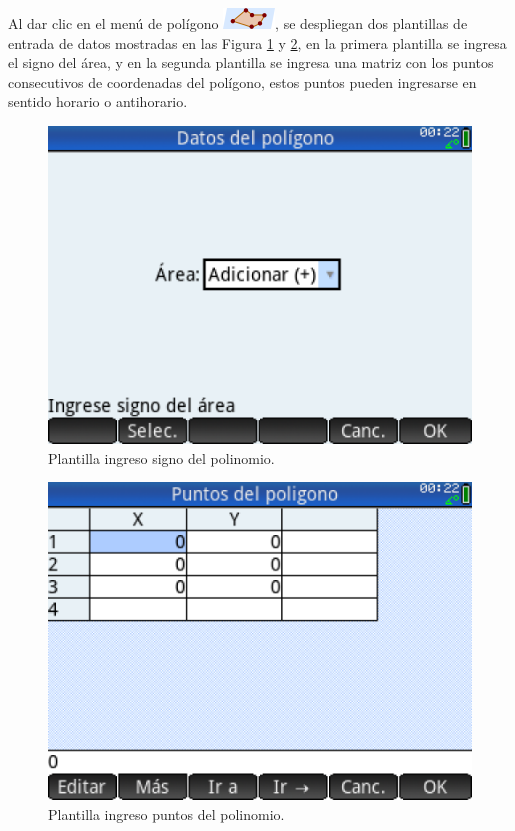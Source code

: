 \documentclass[spanish,xcolor=pdftex,dvipsnames,table,mathserif]{scrartcl}
\begin{document}
Al dar clic en el menú de polígono \includegraphics{imagenes/men_poligono}, se despliegan dos plantillas de entrada de datos mostradas en las Figura \ref{fig:pol1} y \ref{fig:pol2}, en la primera plantilla se ingresa el signo del área, y en la segunda plantilla se ingresa una matriz con los puntos consecutivos de coordenadas del polígono, estos puntos pueden ingresarse en sentido horario o antihorario.

\begin{figure}[H]
	\centering
	\caption[Plantilla ingreso signo del polinomio.]{Plantilla ingreso signo del polinomio.}
	\label{fig:pol1}
	\includegraphics[width=0.45\linewidth]{imagenes/ingresoPolSigno}
\end{figure}
\begin{figure}[H]
	\centering
	\caption[Plantilla ingreso puntos del polinomio.]{Plantilla ingreso puntos del polinomio.}
	\label{fig:pol2}
	\includegraphics[width=0.45\linewidth]{imagenes/ingresoPolinomio}
\end{figure}
\end{document}
